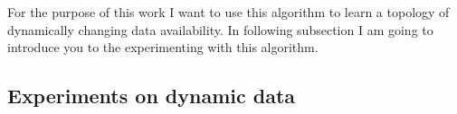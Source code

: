 For the purpose of this work I want to use this algorithm to learn a topology of dynamically changing data availability. In following subsection I am going to introduce you to the experimenting with this algorithm.

\subsection{Experiments on dynamic data}